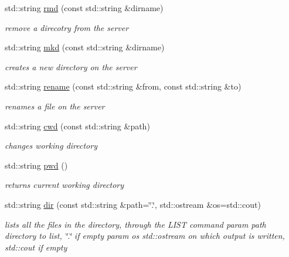 \begin{CompactItemize}
std::string \hyperlink{classftplib_1_1FTP_2a96ea655350a479cdf5f34254fd4ac8}{rmd} (const std::string \&dirname)
\begin{CompactList}\small\item\em remove a direcotry from the server \item\end{CompactList}\item 
std::string \hyperlink{classftplib_1_1FTP_05c4b118a0e278e70c79c1c42484f669}{mkd} (const std::string \&dirname)
\begin{CompactList}\small\item\em creates a new directory on the server \item\end{CompactList}\item 
std::string \hyperlink{classftplib_1_1FTP_0adece922028464ff064da24b539798d}{rename} (const std::string \&from, const std::string \&to)
\begin{CompactList}\small\item\em renames a file on the server \item\end{CompactList}\item 
std::string \hyperlink{classftplib_1_1FTP_7cd3c7fc71ae0c7dbdfcee88417d2685}{cwd} (const std::string \&path)
\begin{CompactList}\small\item\em changes working directory \item\end{CompactList}\item 
std::string \hyperlink{classftplib_1_1FTP_7c01c7b062848c7fc1d3caf95758b109}{pwd} ()
\begin{CompactList}\small\item\em returns current working directory \item\end{CompactList}\item 
std::string \hyperlink{classftplib_1_1FTP_42749c4425e33349f605ec0a8b389731}{dir} (const std::string \&path=\char`\"{}.\char`\"{}, std::ostream \&os=std::cout)
\begin{CompactList}\small\item\em lists all the files in the directory, through the LIST command param path directory to list, \char`\"{}.\char`\"{} if empty param os std::ostream on which output is written, std::cout if empty \item\end{CompactList}\item 

\end{CompactItemize}

